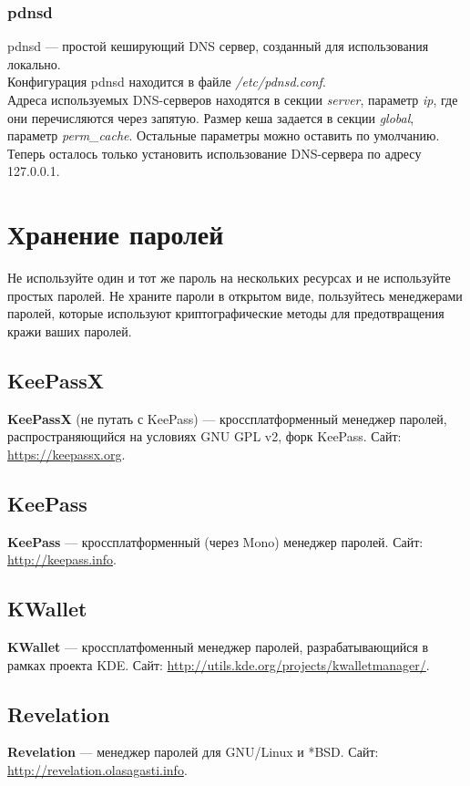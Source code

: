 \subsubsection{pdnsd}
pdnsd --- простой кеширующий DNS сервер, созданный для использования локально.\\
Конфигурация pdnsd находится в файле \textit{/etc/pdnsd.conf}.\\
Адреса используемых DNS-серверов находятся в секции \textit{server}, параметр \textit{ip}, где они перечисляются через запятую. Размер кеша задается в секции \textit{global}, параметр \textit{perm\_cache}. Остальные параметры можно оставить по умолчанию.\\
Теперь осталось только установить использование DNS-сервера по адресу 127.0.0.1.

\section{Хранение паролей}
\begin{important}
Не используйте один и тот же пароль на нескольких ресурсах и не используйте простых паролей. Не храните пароли в открытом виде, пользуйтесь менеджерами паролей, которые используют криптографические методы для предотвращения кражи ваших паролей.
\end{important}
\subsection{KeePassX}
\textbf{KeePassX} (не путать с KeePass) --- кроссплатформенный менеджер паролей, распространяющийся на условиях GNU GPL v2, форк KeePass. Сайт: \url{https://keepassx.org}.
\subsection{KeePass}
\textbf{KeePass} --- кроссплатформенный (через Mono) менеджер паролей. Сайт: \url{http://keepass.info}.
\subsection{KWallet}
\textbf{KWallet} --- кроссплатфоменный менеджер паролей, разрабатывающийся в рамках проекта KDE. Сайт: \url{http://utils.kde.org/projects/kwalletmanager/}.
\subsection{Revelation}
\textbf{Revelation} --- менеджер паролей для GNU/Linux и *BSD. Сайт: \url{http://revelation.olasagasti.info}.

